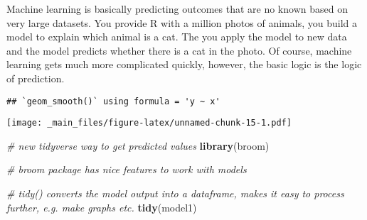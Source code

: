 \documentclass[
]{book}
\newenvironment{Shaded}{\begin{snugshade}}{\end{snugshade}}
\newcommand{\AttributeTok}[1]{\textcolor[rgb]{0.13,0.29,0.53}{#1}}
\newcommand{\CommentTok}[1]{\textcolor[rgb]{0.56,0.35,0.01}{\textit{#1}}}
\newcommand{\FunctionTok}[1]{\textcolor[rgb]{0.13,0.29,0.53}{\textbf{#1}}}
\newcommand{\NormalTok}[1]{#1}
\newcommand{\OtherTok}[1]{\textcolor[rgb]{0.56,0.35,0.01}{#1}}
\newcommand{\SpecialCharTok}[1]{\textcolor[rgb]{0.81,0.36,0.00}{\textbf{#1}}}
\newcommand{\StringTok}[1]{\textcolor[rgb]{0.31,0.60,0.02}{#1}}
\begin{document}
Machine learning is basically predicting outcomes that are no known based on very large datasets. You provide R with a million photos of animals, you build a model to explain which animal is a cat. The you apply the model to new data and the model predicts whether there is a cat in the photo. Of course, machine learning gets much more complicated quickly, however, the basic logic is the logic of prediction.

\begin{Shaded}
\end{Shaded}

\begin{verbatim}
## `geom_smooth()` using formula = 'y ~ x'
\end{verbatim}

\texttt{[image: \_main\_files/figure-latex/unnamed-chunk-15-1.pdf]}

\begin{Shaded}
\begin{Highlighting}[]
\CommentTok{\# new tidyverse way to get predicted values}
\FunctionTok{library}\NormalTok{(broom)}

\CommentTok{\# broom package has nice features to work with models}

\CommentTok{\# tidy() converts the model output into a dataframe, makes it easy to process further, e.g. make graphs etc.}
\FunctionTok{tidy}\NormalTok{(model1)}
\end{Highlighting}
\end{Shaded}
\end{document}
